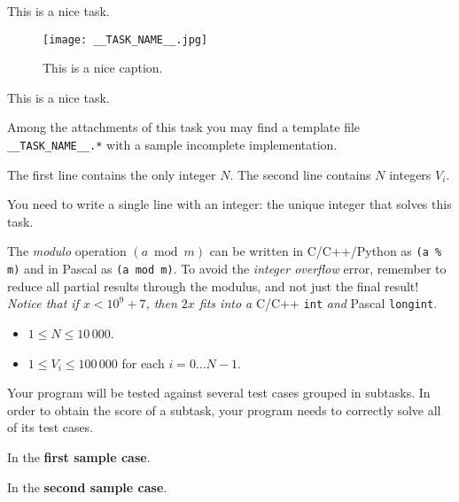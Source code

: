 \usepackage{xcolor}
\usepackage{afterpage}
\usepackage{pifont,mdframed}
\usepackage[bottom]{footmisc}

\makeatletter
\gdef\this@inputfilename{input}
\gdef\this@outputfilename{output}
\makeatother

    This is a nice task.

    \begin{figure}[H]
        \centering
        \texttt{[image: \_\_TASK\_NAME\_\_.jpg]}
        \caption{This is a nice caption.}
    \end{figure}

    This is a nice task.

\begin{warning}
Among the attachments of this task you may find a template file \texttt{__TASK_NAME__.*} with a sample incomplete implementation.
\end{warning}

\InputFile
The first line contains the only integer $N$. The second line contains $N$ integers $V_i$.

\OutputFile
You need to write a single line with an integer: the unique integer that solves this task.

\begin{danger}
The \emph{modulo} operation $(a \bmod m)$ can be written in C/C++/Python as \verb|(a % m)| and in Pascal as \verb|(a mod m)|. To avoid the \emph{integer overflow} error, remember to reduce all partial results through the modulus, and not just the final result! \\
\emph{Notice that if $x < 10^9 + 7$, then $2 x$ fits into a} C/C++ \verb|int| \emph{and} Pascal \verb|longint|.
\end{danger}

\Constraints
\begin{itemize}[nolistsep, itemsep=2mm]
	\item $1 \le N \le 10\,000$.
	\item $1 \le V_i \le 100\,000$ for each $i=0\ldots N-1$.
\end{itemize}

\Scoring
Your program will be tested against several test cases grouped in subtasks.
In order to obtain the score of a subtask, your program needs to correctly solve all of its test cases.







\Examples
\begin{example}
%
%
\end{example}


\Explanation
In the \textbf{first sample case}.

In the \textbf{second sample case}.
